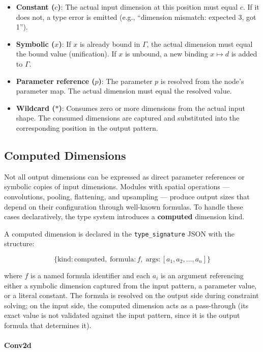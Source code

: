 \documentclass[11pt,a4paper]{article}
\begin{document}
\begin{itemize}
	\item \textbf{Constant ($c$)}: The actual input dimension at this position must equal $c$. If it does not, a type error is emitted (e.g., ``dimension mismatch: expected 3, got 1'').
	\item \textbf{Symbolic ($x$)}: If $x$ is already bound in $\Gamma$, the actual dimension must equal the bound value (unification). If $x$ is unbound, a new binding $x \mapsto d$ is added to $\Gamma$.
	\item \textbf{Parameter reference ($p$)}: The parameter $p$ is resolved from the node's parameter map. The actual dimension must equal the resolved value.
	\item \textbf{Wildcard ($*$)}: Consumes zero or more dimensions from the actual input shape. The consumed dimensions are captured and substituted into the corresponding position in the output pattern.
\end{itemize}


\subsection{Computed Dimensions}

Not all output dimensions can be expressed as direct parameter references or symbolic copies of input dimensions. Modules with spatial operations --- convolutions, pooling, flattening, and upsampling --- produce output sizes that depend on their configuration through well-known formulas. To handle these cases declaratively, the type system introduces a \textbf{computed} dimension kind.

A computed dimension is declared in the \texttt{type\_signature} JSON with the structure:

\[
\{ \text{kind}: \text{computed},\; \text{formula}: f,\; \text{args}: [a_1, a_2, \ldots, a_n] \}
\]

where $f$ is a named formula identifier and each $a_i$ is an argument referencing either a symbolic dimension captured from the input pattern, a parameter value, or a literal constant. The formula is resolved on the output side during constraint solving; on the input side, the computed dimension acts as a pass-through (its exact value is not validated against the input pattern, since it is the output formula that determines it).

\paragraph{Conv2d}
\end{document}
